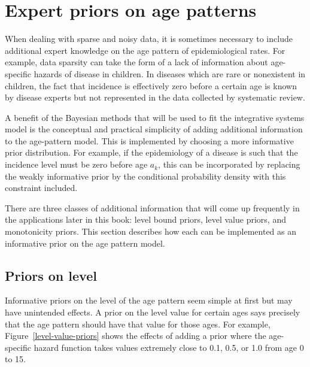 \chapter{Expert priors on age patterns}
\label{theory-expert_priors}

When dealing with sparse and noisy data, it is sometimes necessary to
include additional expert knowledge on the age pattern of
epidemiological rates.  For example, data sparsity can take the form
of a lack of information about age-specific hazards of disease in children.  In
diseases which are rare or nonexistent in children, the fact that incidence is
effectively zero before a certain age is known by disease experts but
not represented in the data collected by systematic review.

A benefit of the Bayesian methods that will be used to fit the
integrative systems model is the conceptual and practical simplicity
of adding additional information to the age-pattern model.  This is
implemented by choosing a more informative prior distribution.  For
example, if the epidemiology of a disease is such that the incidence
level must be zero before age $a_k$, this can be incorporated by
replacing the weakly informative prior by the conditional probability
density with this constraint included.

There are three classes of additional information that will come up
frequently in the applications later in this book: level bound priors,
level value priors, and monotonicity priors. This section describes
how each can be implemented as an informative prior on the age pattern
model.


\section{Priors on level}

Informative priors on the level of the age pattern seem simple at
first but may have unintended effects.  A prior on the level value for
certain ages says precisely that the age pattern should have that
value for those ages.  For example, Figure~\ref{level-value-priors}
shows the effects of adding a prior where the age-specific hazard function takes values extremely
close to 0.1, 0.5, or 1.0 from age 0 to 15.


